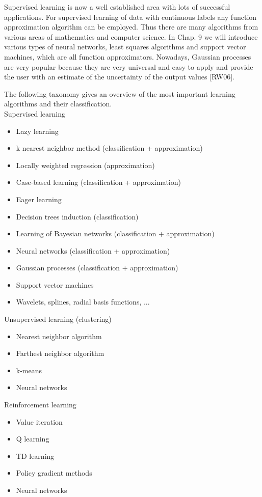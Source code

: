 \documentclass[10pt]{article}
\begin{document}
Supervised learning is now a well established area with lots of successful applications. For supervised learning of data with continuous labels any function approximation algorithm can be employed. Thus there are many algorithms from various areas of mathematics and computer science. In Chap. 9 we will introduce various types of neural networks, least squares algorithms and support vector machines, which are all function approximators. Nowadays, Gaussian processes are very popular because they are very universal and easy to apply and provide the user with an estimate of the uncertainty of the output values [RW06].

The following taxonomy gives an overview of the most important learning algorithms and their classification.\\
Supervised learning

\begin{itemize}
  \item Lazy learning
  \item k nearest neighbor method (classification + approximation)
  \item Locally weighted regression (approximation)
  \item Case-based learning (classification + approximation)
  \item Eager learning
  \item Decision trees induction (classification)
  \item Learning of Bayesian networks (classification + approximation)
  \item Neural networks (classification + approximation)
  \item Gaussian processes (classification + approximation)
  \item Support vector machines
  \item Wavelets, splines, radial basis functions, ...
\end{itemize}

Unsupervised learning (clustering)

\begin{itemize}
  \item Nearest neighbor algorithm
  \item Farthest neighbor algorithm
  \item k-means
  \item Neural networks
\end{itemize}

Reinforcement learning

\begin{itemize}
  \item Value iteration
  \item Q learning
  \item TD learning
  \item Policy gradient methods
  \item Neural networks
\end{itemize}
\end{document}
